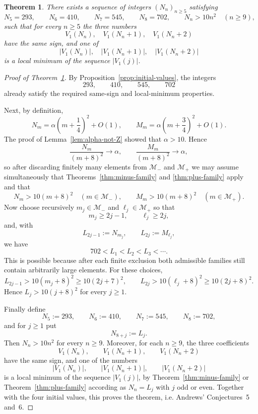 \documentclass[10pt,a4paper]{amsart}
\newtheorem{theorem}{Theorem}
\begin{document}
\begin{theorem}\label{thm:main}
There exists a sequence of integers $(N_n)_{n\ge 5}$ satisfying
\[
  N_5=293,\qquad N_6=410,\qquad N_7=545,\qquad N_8=702,\qquad N_n>10n^2\quad (n\ge 9),
\]
such that for every $n\ge 5$ the three numbers
\[
  V_1(N_n),\quad V_1(N_n+1),\quad V_1(N_n+2)
\]
have the same sign, and one of
\[
  |V_1(N_n)|,\quad |V_1(N_n+1)|,\quad |V_1(N_n+2)|
\]
is a local minimum of the sequence $|V_1(j)|$.
\end{theorem}

\begin{proof}[Proof of Theorem~\ref{thm:main}]
By Proposition~\ref{prop:initial-values}, the integers
\[
  293,\qquad 410,\qquad 545,\qquad 702
\]
already satisfy the required same-sign and local-minimum properties.

Next, by definition,
\[
  N_m=\alpha\left(m+\frac14\right)^2+O(1),
  \qquad
  M_m=\alpha\left(m+\frac34\right)^2+O(1).
\]
The proof of Lemma~\ref{lem:alpha-not-Z} showed that $\alpha>10$. Hence
\[
  \frac{N_m}{(m+8)^2}\to \alpha,
  \qquad
  \frac{M_m}{(m+8)^2}\to \alpha,
\]
so after discarding finitely many elements from $\mathcal M_-$ and $\mathcal M_+$ we may assume simultaneously that Theorems~\ref{thm:minus-family} and \ref{thm:plus-family} apply and that
\[
  N_m>10(m+8)^2\quad(m\in\mathcal M_-),
  \qquad
  M_m>10(m+8)^2\quad(m\in\mathcal M_+).
\]
Now choose recursively $m_j\in\mathcal M_-$ and $\ell_j\in\mathcal M_+$ so that
\[
  m_j\ge 2j-1,
  \qquad
  \ell_j\ge 2j,
\]
and, with
\[
  L_{2j-1}:=N_{m_j},
  \qquad
  L_{2j}:=M_{\ell_j},
\]
we have
\[
  702<L_1<L_2<L_3<\cdots.
\]
This is possible because after each finite exclusion both admissible families still contain arbitrarily large elements. For these choices,
\[
  L_{2j-1}>10(m_j+8)^2\ge 10(2j+7)^2,
  \qquad
  L_{2j}>10(\ell_j+8)^2\ge 10(2j+8)^2.
\]
Hence $L_j>10(j+8)^2$ for every $j\ge1$.

Finally define
\[
  N_5:=293,\qquad N_6:=410,\qquad N_7:=545,\qquad N_8:=702,
\]
and for $j\ge1$ put
\[
  N_{8+j}:=L_j.
\]
Then $N_n>10n^2$ for every $n\ge 9$. Moreover, for each $n\ge9$, the three coefficients
\[
  V_1(N_n),\qquad V_1(N_n+1),\qquad V_1(N_n+2)
\]
have the same sign, and one of the numbers
\[
  |V_1(N_n)|,\qquad |V_1(N_n+1)|,\qquad |V_1(N_n+2)|
\]
is a local minimum of the sequence $|V_1(j)|$, by Theorem~\ref{thm:minus-family} or Theorem~\ref{thm:plus-family} according as $N_n=L_j$ with $j$ odd or even. 
Together with the four initial values, this proves the theorem, i.e. Andrews' Conjectures~5 and~6.
\end{proof}
\end{document}

